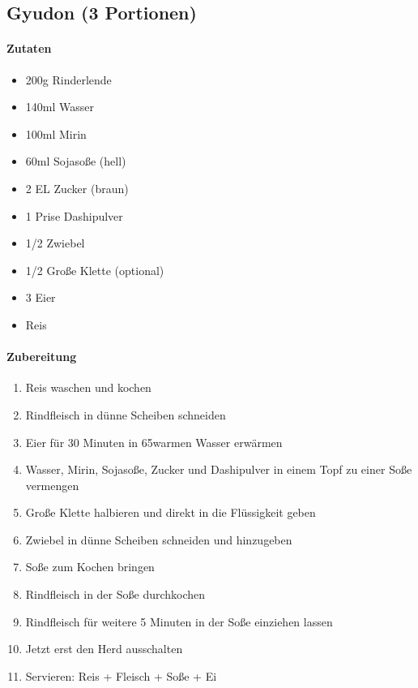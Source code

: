 \clearpage
\subsection{Gyudon (3 Portionen)}
\paragraph{Zutaten}
\begin{itemize}[noitemsep]
	\item 200g Rinderlende 
	\item 140ml Wasser
	\item 100ml Mirin
	\item 60ml Sojasoße (hell)
	\item 2 EL Zucker (braun)
	\item 1 Prise  Dashipulver
	\item 1/2 Zwiebel
	\item 1/2 Große Klette (optional)
	\item 3 Eier
	\item Reis
\end{itemize}

\paragraph{Zubereitung}
\begin{enumerate}[noitemsep]
	\item Reis waschen und kochen
	\item Rindfleisch in dünne Scheiben schneiden
	\item Eier für 30 Minuten in 65\textdegree warmen Wasser erwärmen
	\item Wasser, Mirin, Sojasoße, Zucker und Dashipulver in einem Topf zu einer Soße vermengen
	\item Große Klette halbieren und direkt in die Flüssigkeit geben
	\item Zwiebel in dünne Scheiben schneiden und hinzugeben
	\item Soße zum Kochen bringen 
	\item Rindfleisch in der Soße durchkochen
	\item Rindfleisch für weitere 5 Minuten in der Soße einziehen lassen
	\item Jetzt erst den Herd ausschalten
	\item Servieren: Reis + Fleisch + Soße + Ei
\end{enumerate}
